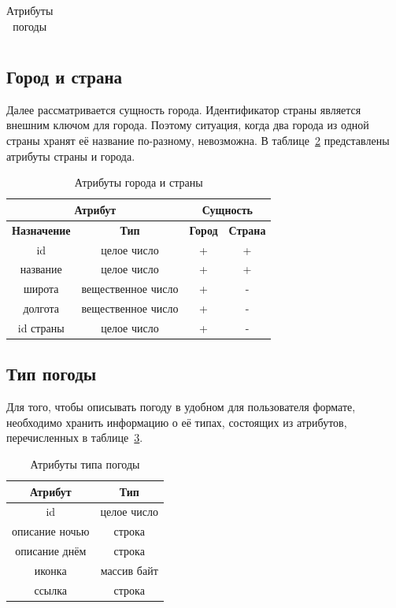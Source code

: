 \begin{table}[h!]
\begin{tabular}{ |c|c|c|c| }
    \end{tabular}
    \caption{\centering Атрибуты погоды}
    \label{table:weather_attr}
\end{table}

\subsection*{Город и страна}
Далее рассматривается сущность города.
Идентификатор страны является внешним ключом для города.
Поэтому ситуация, когда два города из одной страны хранят её название по-разному, невозможна.
В таблице~\ref{table:city_attr} представлены атрибуты страны и города.
\begin{table}[h!]
    \centering
    \begin{tabular}{ |c|c|c|c| }
        \hline
        \multicolumn{2}{|c|}{Атрибут} & \multicolumn{2}{|c|}{Сущность}  \\
        \hline
            \textbf{Назначение} & \textbf{Тип} & \textbf{Город} & \textbf{Страна} \\
        \hline
            id & целое число & + & + \\
        \hline
            название & целое число & + & + \\
        \hline
            широта & вещественное число & + & - \\
        \hline
            долгота & вещественное число & + & - \\
        \hline
            id страны & целое число & + & - \\
        \hline
            
    \end{tabular}
    \caption{\centering Атрибуты города и страны}
    \label{table:city_attr}
\end{table}

\subsection*{Тип погоды}
Для того, чтобы описывать погоду в удобном для пользователя формате, необходимо хранить информацию о её типах, состоящих из атрибутов, перечисленных в таблице~\ref{table:type_attr}.

\begin{table}[h!]
    \centering
    \begin{tabular}{ |c|c| }
        \hline
            \textbf{Атрибут} & \textbf{Тип} \\
        \hline
            id & целое число \\
        \hline
            описание ночью & строка \\
        \hline
            описание днём & строка \\
        \hline
            иконка & массив байт \\
        \hline
            ссылка & строка \\
        \hline
            
    \end{tabular}
    \caption{\centering Атрибуты типа погоды}
    \label{table:type_attr}
\end{table}

